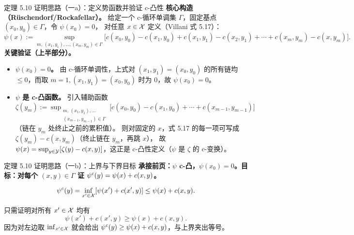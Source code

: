 \begin{frame}{定理 5.10 证明思路（一a）：定义势函数并验证 c-凸性}
  \textbf{核心构造（Rüschendorf/Rockafellar）。}\proofskipnote
  给定一个 c-循环单调集 $\Gamma$，固定基点 $(x_0,y_0)\in\Gamma$，令 $\psi(x_0)=0$，
  对任意 $x\in\mathcal{X}$ 定义（Villani 式 5.17）：
  \[
    \psi(x) := \sup_{m,\,(x_1,y_1),\ldots,(x_m,y_m)\in\Gamma}
    \bigl[c(x_0,y_0)-c(x_1,y_0)+c(x_1,y_1)-c(x_2,y_1)
    +\cdots+c(x_m,y_m)-c(x,y_m)\bigr].
  \]
  \textbf{关键验证（上半部分）。}
  \begin{itemize}\small
    \item \textbf{$\psi(x_0)=0$。} 由 c-循环单调性，上式对 $(x_1,y_1)=(x_0,y_0)$ 的所有链均 $\le 0$，而取 $m=1,(x_1,y_1)=(x_0,y_0)$ 时为 $0$，故 $\psi(x_0)=0$。
    \item \textbf{$\psi$ 是 c-凸函数。} 引入辅助函数
      $\zeta(y_m):=\sup_{\substack{m,\,(x_1,y_1),\ldots\\(x_{m-1},y_{m-1})\in\Gamma}}
      \bigl[c(x_0,y_0)-c(x_1,y_0)+\cdots+c(x_{m-1},y_{m-1})\bigr]$（链在 $y_m$ 处终止之前的累积值）。
      则对固定的 $x$，式 5.17 的每一项可写成 $\zeta(y_m)-c(x,y_m)$（终止链在 $y_m$，再跳 $x$），
      故 $\psi(x)=\sup_{y\in\mathcal{Y}}[\zeta(y)-c(x,y)]$，这正是 c-凸性定义（$\psi$ 是 $\zeta$ 的 c-变换）。
  \end{itemize}
\end{frame}

\begin{frame}{定理 5.10 证明思路（一b）：上界与下界目标}
  \textbf{承接前页：$\psi$ c-凸，$\psi(x_0)=0$。}\proofskipnote \textbf{目标：对每个 $(x,y)\in\Gamma$ 证 ${\psi}^{c}(y)=\psi(x)+c(x,y)$。}

  \[
    {\psi}^{c}(y)
    =\inf_{x'\in\mathcal{X}}[\psi(x')+c(x',y)]
    \le \psi(x)+c(x,y).
  \]

  只需证明对所有 $x'\in\mathcal{X}$ 均有
  \[
    \psi(x')+c(x',y)\ge\psi(x)+c(x,y).
  \]
  因为对左边取 $\inf_{x'\in\mathcal{X}}$ 就会给出
  ${\psi}^{c}(y)\ge\psi(x)+c(x,y)$，与上界夹出等号。

\end{frame}

